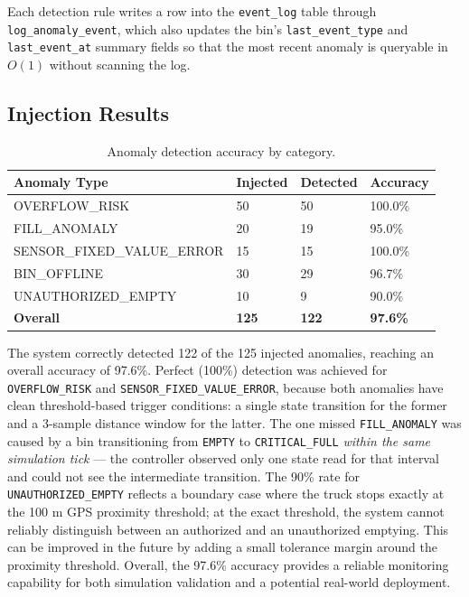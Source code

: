 \documentclass[12pt,a4paper]{report}
\begin{document}
\indent Each detection rule writes a row into the \texttt{event\_log} table through \texttt{log\_anomaly\_event}, which also updates the bin's \texttt{last\_event\_type} and \texttt{last\_event\_at} summary fields so that the most recent anomaly is queryable in $O(1)$ without scanning the log.
\clearpage
\subsection*{Injection Results}

\begin{table}[H]
\centering
\caption{Anomaly detection accuracy by category.}
\label{tab:anomaly_results}
\begin{tabular}{llll}
\toprule
\textbf{Anomaly Type} & \textbf{Injected} & \textbf{Detected} & \textbf{Accuracy} \\
\midrule
OVERFLOW\_RISK            & 50 & 50 & 100.0\% \\
FILL\_ANOMALY             & 20 & 19 & 95.0\% \\
SENSOR\_FIXED\_VALUE\_ERROR & 15 & 15 & 100.0\% \\
BIN\_OFFLINE              & 30 & 29 & 96.7\% \\
UNAUTHORIZED\_EMPTY       & 10 & 9  & 90.0\% \\
\midrule
\textbf{Overall}          & \textbf{125} & \textbf{122} & \textbf{97.6\%} \\
\bottomrule
\end{tabular}
\end{table}

\indent The system correctly detected 122 of the 125 injected anomalies, reaching an overall accuracy of 97.6\%. Perfect (100\%) detection was achieved for \texttt{OVERFLOW\_RISK} and \texttt{SENSOR\_FIXED\_VALUE\_ERROR}, because both anomalies have clean threshold-based trigger conditions: a single state transition for the former and a 3-sample distance window for the latter. The one missed \texttt{FILL\_ANOMALY} was caused by a bin transitioning from \texttt{EMPTY} to \texttt{CRITICAL\_FULL} \textit{within the same simulation tick} --- the controller observed only one state read for that interval and could not see the intermediate transition. The 90\% rate for \texttt{UNAUTHORIZED\_EMPTY} reflects a boundary case where the truck stops exactly at the 100 m GPS proximity threshold; at the exact threshold, the system cannot reliably distinguish between an authorized and an unauthorized emptying. This can be improved in the future by adding a small tolerance margin around the proximity threshold. Overall, the 97.6\% accuracy provides a reliable monitoring capability for both simulation validation and a potential real-world deployment.
\clearpage
\end{document}
